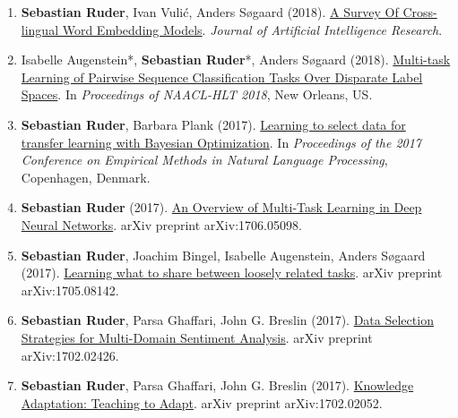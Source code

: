 \documentclass[10pt,letterpaper]{article}
\begin{document}
\begin{enumerate}
	\item \textbf{Sebastian Ruder}, Ivan Vulić, Anders Søgaard (2018). \href{https://arxiv.org/abs/1706.04902}{A Survey Of Cross-lingual Word Embedding Models}. \textit{Journal of Artificial Intelligence Research}.

	\item Isabelle Augenstein*, \textbf{Sebastian Ruder}*, Anders Søgaard (2018). \href{https://arxiv.org/abs/1802.09913}{Multi-task Learning of Pairwise Sequence Classification Tasks Over Disparate Label Spaces}. In \textit{Proceedings of NAACL-HLT 2018}, New Orleans, US. 
	
	\newenvironment{starfootnotes}
  {\par\edef\savedfootnotenumber{\number\value{footnote}}
   \renewcommand{\thefootnote}{$\star$} 
   \setcounter{footnote}{0}}
  {\par\setcounter{footnote}{\savedfootnotenumber}}
	
\begin{starfootnotes}
\end{starfootnotes}
		
	\item \textbf{Sebastian Ruder}, Barbara Plank (2017). \href{https://arxiv.org/abs/1707.05246}{Learning to select data for transfer learning with Bayesian Optimization}. In \textit{Proceedings of the 2017 Conference on Empirical Methods in Natural Language Processing}, Copenhagen, Denmark.
	
	\item \textbf{Sebastian Ruder} (2017). \href{https://arxiv.org/abs/1706.05098}{An Overview of Multi-Task Learning in Deep Neural Networks}. arXiv preprint arXiv:1706.05098.
	
	\item \textbf{Sebastian Ruder}, Joachim Bingel, Isabelle Augenstein, Anders Søgaard (2017). \href{https://arxiv.org/abs/1705.08142}{Learning what to share between loosely related tasks}. arXiv preprint arXiv:1705.08142.
	
	\item \textbf{Sebastian Ruder}, Parsa Ghaffari, John G. Breslin (2017). \href{https://arxiv.org/abs/1702.02426}{Data Selection Strategies for Multi-Domain Sentiment Analysis}. arXiv preprint arXiv:1702.02426.
	
	\item \textbf{Sebastian Ruder}, Parsa Ghaffari, John G. Breslin (2017). \href{https://arxiv.org/abs/1702.02052}{Knowledge Adaptation: Teaching to Adapt}. arXiv preprint arXiv:1702.02052.
	

\end{enumerate}
\end{document}
